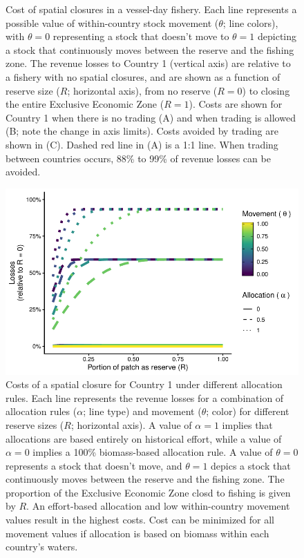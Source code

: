 \documentclass[12pt]{article}
\begin{document}
\begin{figure}[htbp]
\caption{\label{fig:PNA_model}Cost of spatial closures in a vessel-day fishery. Each line represents a possible value of within-country stock movement ($\theta$; line colors), with $\theta = 0$ representing a stock that doesn't move to $\theta = 1$ depicting a stock that continuously moves between the reserve and the fishing zone. The revenue losses to Country 1 (vertical axis) are relative to a fishery with no spatial closures, and are shown as a function of reserve size ($R$; horizontal axis), from no reserve ($R = 0$) to closing the entire Exclusive Economic Zone ($R = 1$). Costs are shown for Country 1 when there is no trading (A) and when trading is allowed (B; note the change in axis limits). Costs avoided by trading are shown in (C). Dashed red line in (A) is a 1:1 line. When trading between countries occurs, 88\% to 99\% of revenue losses can be avoided.}
\end{figure}

\begin{figure}[htbp]
\centering
\includegraphics{img/allocation_cost_plot.pdf}
\caption{\label{fig:allocation_cost_plot}Costs of a spatial closure for Country 1 under different allocation rules. Each line represents the revenue losses for a combination of allocation rules ($\alpha$; line type) and movement ($\theta$; color) for different reserve sizes ($R$; horizontal axis). A value of $\alpha = 1$ implies that allocations are based entirely on historical effort, while a value of $\alpha = 0$ implies a 100\% biomass-based allocation rule. A value of $\theta = 0$ represents a stock that doesn't move, and $\theta = 1$ depics a stock that continuously moves between the reserve and the fishing zone. The proportion of the Exclusive Economic Zone closd to fishing is given by $R$. An effort-based allocation and low within-country movement values result in the highest costs. Cost can be minimized for all movement values if allocation is based on biomass within each country’s waters.}
\end{figure}
\end{document}
